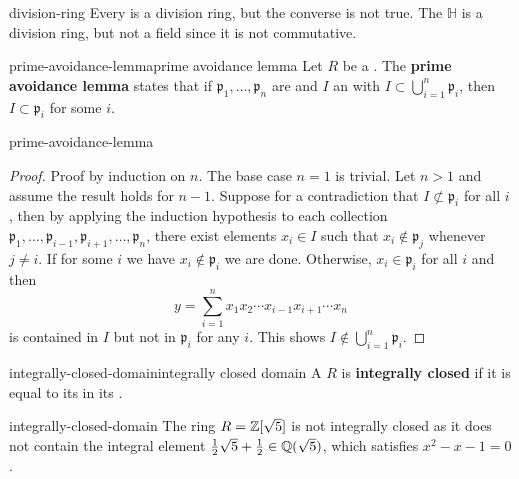\begin{example}{division-ring}
    Every  is a division ring, but the converse is not true. The  $\mathbb{H}$ is a division ring, but not a field since it is not commutative.
\end{example}

\begin{topic}{prime-avoidance-lemma}{prime avoidance lemma}
    Let $R$ be a . The \textbf{prime avoidance lemma} states that if $\mathfrak{p}_1, \ldots, \mathfrak{p}_n$ are  and $I$ an  with $I \subset \bigcup_{i = 1}^{n} \mathfrak{p}_i$, then $I \subset \mathfrak{p}_i$ for some $i$.
\end{topic}

\begin{example}{prime-avoidance-lemma}
    \begin{proof}
        Proof by induction on $n$. The base case $n = 1$ is trivial. Let $n > 1$ and assume the result holds for $n - 1$. Suppose for a contradiction that $I \not\subset \mathfrak{p}_i$ for all $i$, then by applying the induction hypothesis to each collection $\mathfrak{p}_1, \ldots, \mathfrak{p}_{i - 1}, \mathfrak{p}_{i + 1}, \ldots, \mathfrak{p}_n$, there exist elements $x_i \in I$ such that $x_i \not\in \mathfrak{p}_j$ whenever $j \ne i$. If for some $i$ we have $x_i \not\in \mathfrak{p}_i$ we are done. Otherwise, $x_i \in \mathfrak{p}_i$ for all $i$ and then
        \[ y = \sum_{i = 1}^{n} x_1 x_2 \cdots x_{i - 1} x_{i + 1} \cdots x_n \]
        is contained in $I$ but not in $\mathfrak{p}_i$ for any $i$. This shows $I \not\in \bigcup_{i = 1}^{n} \mathfrak{p}_i$.
    \end{proof}
\end{example}

\begin{topic}{integrally-closed-domain}{integrally closed domain}
    A  $R$ is \textbf{integrally closed} if it is equal to its  in its .
\end{topic}

\begin{example}{integrally-closed-domain}
    The ring $R = \mathbb{Z}[\sqrt{5}]$ is not integrally closed as it does not contain the integral element $\tfrac{1}{2} \sqrt{5} + \tfrac{1}{2} \in \mathbb{Q}(\sqrt{5})$, which satisfies $x^2 - x - 1 = 0$.
\end{example}

